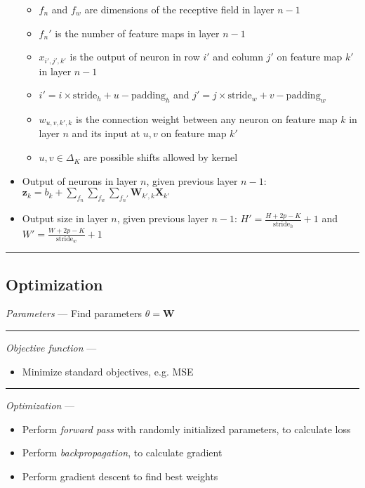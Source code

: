 \begin{itemize}
\begin{itemize}
        \item $f_n$ and $f_w$ are dimensions of the receptive field in layer $n-1$
        \item $f_n'$ is the number of feature maps in layer $n-1$
        \item $x_{i',j',k'}$ is the output of neuron in row $i'$ and column $j'$ on feature map $k'$ in layer $n-1$
        \item $i' = i \times \textrm{stride}_h + u - \textrm{padding}_h$
        and $j' = j \times \textrm{stride}_w + v - \textrm{padding}_w$
        \item $w_{u,v,k',k}$ is the connection weight between any neuron on feature map $k$ in layer $n$ and its input at $u,v$ on feature map $k'$
        \item $u,v \in \Delta_K$ are possible shifts allowed by kernel
    \end{itemize}
    \item Output of neurons in layer $n$, given previous layer $n-1$: \\
    $\boldsymbol{z}_k = b_k + \sum_{f_n} \sum_{f_w} \sum_{f_n'} \boldsymbol{W}_{k',k} \boldsymbol{X}_{k'}$
    \item Output size in layer $n$, given previous layer $n-1$: $H' = \frac{H + 2p - K}{\textrm{stride}_h} + 1$ and
    $W' = \frac{W + 2p - K}{\textrm{stride}_w} + 1$
\end{itemize}

{\color{black}\hrule height 0.001mm}

\subsection*{Optimization}
\emph{Parameters} --- Find parameters $\theta = \boldsymbol{W}$

{\color{lightgray}\hrule height 0.001mm}

\emph{Objective function} --- 
\begin{itemize}
    \item Minimize standard objectives, e.g. MSE
\end{itemize}

{\color{lightgray}\hrule height 0.001mm}

\emph{Optimization} ---
\begin{itemize}
    \item Perform \emph{forward pass} with randomly initialized parameters, to calculate loss
    \item Perform \emph{backpropagation}, to calculate gradient
    \item Perform gradient descent to find best weights 
\end{itemize}
